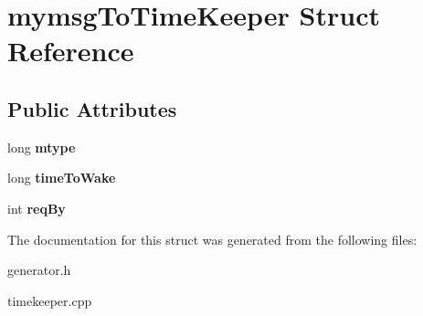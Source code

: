 \hypertarget{structmymsgToTimeKeeper}{\section{mymsg\-To\-Time\-Keeper \-Struct \-Reference}
\label{structmymsgToTimeKeeper}
}
\subsection*{\-Public \-Attributes}
\begin{DoxyCompactItemize}
\item 
\hypertarget{structmymsgToTimeKeeper_a6e495094a0dc010de5f216bd69a48a09}{long {\bfseries mtype}}\label{structmymsgToTimeKeeper_a6e495094a0dc010de5f216bd69a48a09}

\item 
\hypertarget{structmymsgToTimeKeeper_a89de0b539aaaecdfb3ced471753b3f49}{long {\bfseries time\-To\-Wake}}\label{structmymsgToTimeKeeper_a89de0b539aaaecdfb3ced471753b3f49}

\item 
\hypertarget{structmymsgToTimeKeeper_add684d1f2bc659624713a264c28d7df6}{int {\bfseries req\-By}}\label{structmymsgToTimeKeeper_add684d1f2bc659624713a264c28d7df6}

\end{DoxyCompactItemize}


\-The documentation for this struct was generated from the following files\-:\begin{DoxyCompactItemize}
\item 
generator.\-h\item 
timekeeper.\-cpp\end{DoxyCompactItemize}
